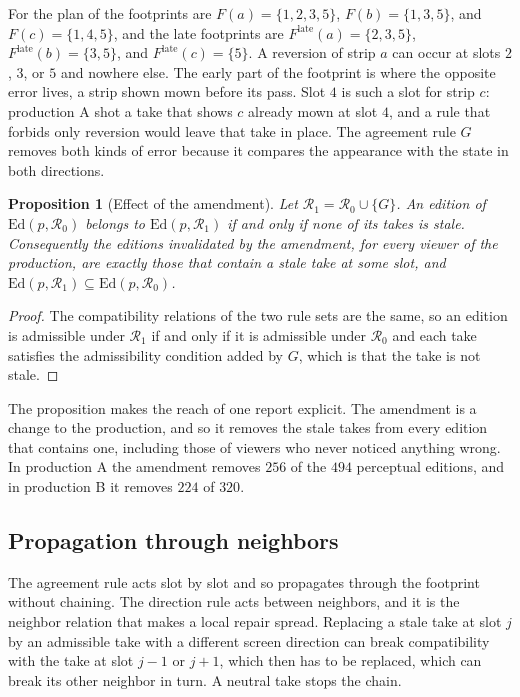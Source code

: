 \documentclass[11pt,twoside,openright]{book}
\theoremstyle{plain}
\newtheorem{proposition}[theorem]{Proposition}
\theoremstyle{definition}
\theoremstyle{remark}
\newcommand{\Ed}{\mathrm{Ed}}       %
\begin{document}
For the plan of  the footprints are $F(a)=\{1,2,3,5\}$, $F(b)=\{1,3,5\}$, and $F(c)=\{1,4,5\}$, and the late footprints are $F^{\mathrm{late}}(a)=\{2,3,5\}$, $F^{\mathrm{late}}(b)=\{3,5\}$, and $F^{\mathrm{late}}(c)=\{5\}$. A reversion of strip $a$ can occur at slots $2$, $3$, or $5$ and nowhere else. The early part of the footprint is where the opposite error lives, a strip shown mown before its pass. Slot $4$ is such a slot for strip $c$: production A shot a take that shows $c$ already mown at slot $4$, and a rule that forbids only reversion would leave that take in place. The agreement rule $G$ removes both kinds of error because it compares the appearance with the state in both directions.

\begin{proposition}[Effect of the amendment]\label{prop:footprint}
Let $\mathcal R_1=\mathcal R_0\cup\{G\}$. An edition of $\Ed(p,\mathcal R_0)$ belongs to $\Ed(p,\mathcal R_1)$ if and only if none of its takes is stale. Consequently the editions invalidated by the amendment, for every viewer of the production, are exactly those that contain a stale take at some slot, and $\Ed(p,\mathcal R_1)\subseteq\Ed(p,\mathcal R_0)$.
\end{proposition}

\begin{proof}
The compatibility relations of the two rule sets are the same, so an edition is admissible under $\mathcal R_1$ if and only if it is admissible under $\mathcal R_0$ and each take satisfies the admissibility condition added by $G$, which is that the take is not stale.
\end{proof}

The proposition makes the reach of one report explicit. The amendment is a change to the production, and so it removes the stale takes from every edition that contains one, including those of viewers who never noticed anything wrong. In production A the amendment removes $256$ of the $494$ perceptual editions, and in production B it removes $224$ of $320$.

\subsection{Propagation through neighbors}

The agreement rule acts slot by slot and so propagates through the footprint without chaining. The direction rule acts between neighbors, and it is the neighbor relation that makes a local repair spread. Replacing a stale take at slot $j$ by an admissible take with a different screen direction can break compatibility with the take at slot $j-1$ or $j+1$, which then has to be replaced, which can break its other neighbor in turn. A neutral take stops the chain.
\end{document}

